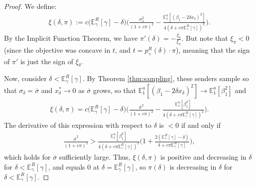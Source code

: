 \documentclass[11pt,dvipsnames]{article}
\begin{document}
\begin{appendix}
\begin{proof}
We define:
\begin{align*}
\xi(\delta,\pi) := 	c\big(\mathbb{E}_\gamma^R[\gamma]-\delta\big)
\big(\frac{\sigma_\delta^2}{(1+c\pi)^2}
-\frac{\mathbb{E}_1^a[(\beta_1-2\delta x_\delta)^2]}{4(\delta + c\pi \mathbb{E}_\gamma^R[\gamma])^2}\big).
\end{align*}
By the Implicit Function Theorem, we have
$\pi'(\delta)= -\frac{\xi_\delta}{\xi_\pi}$.
But note that $\xi_\pi < 0$ (since the objective was concave in $t$, and $t = p_\gamma^R(\delta) \cdot \pi$), meaning that the sign of $\pi'$ is just the sign of $\xi_\delta$.

Now, consider $\delta < \mathbb{E}_\gamma^R[\gamma]$.
By Theorem \ref{thm:sampling}, these senders sample so that $\sigma_\delta = \overline{\sigma}$ and $x_\delta^*\to 0$ as $\overline{\sigma}$ grows, so that $\mathbb{E}_1^a[(\beta_1-2\delta x_\delta)^2]\to\mathbb{E}_1^a[\beta_1^2]$ and
\begin{align*}
\xi(\delta,\pi) = 	c\big(\mathbb{E}_\gamma^R[\gamma]-\delta\big)
\big(\frac{\overline{\sigma}^2}{(1+c\pi)^2}
-\frac{\mathbb{E}_1^a[\beta_1^2]}{4(\delta + c\pi \mathbb{E}_\gamma^R[\gamma])^2}\big).	
\end{align*}
The derivative of this expression with respect to $\delta$ is $< 0$ if and only if
\begin{align*}
\frac{\overline{\sigma}^2}{(1+c\pi)^2}
>
\frac{\mathbb{E}_1^a[\beta_1^2]}{4(\delta + c\pi \mathbb{E}_\gamma^R[\gamma])^2}
\bigg(1+\frac{2(\mathbb{E}_\gamma^R[\gamma]-\delta)}{\delta + c\pi \mathbb{E}_\gamma^R[\gamma]}\bigg),
\end{align*}
which holds for $\overline{\sigma}$ sufficiently large.
Thus, $\xi(\delta,\pi)$ is positive and decreasing in $\delta$ for $\delta < \mathbb{E}_\gamma^R[\gamma]$, and equals $0$ at $\delta=\mathbb{E}_\gamma^R[\gamma]$, so $\pi(\delta)$ is decreasing in $\delta$ for $\delta < \mathbb{E}_\gamma^R[\gamma]$.


\end{proof}
\end{appendix}
\end{document}
